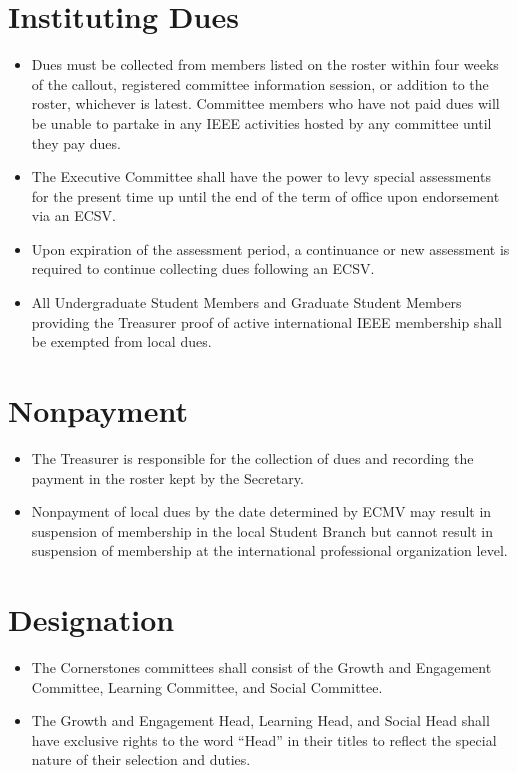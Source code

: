 \documentclass[12pt]{constitution}
\begin{document}
\section{Instituting Dues}
\label{sec:dues_institute}
\begin{itemize}
    \item Dues must be collected from members listed on the roster within four weeks of the callout, registered committee information session, or addition to the roster, whichever is latest. Committee members who have not paid dues will be unable to partake in any IEEE activities hosted by any committee until they pay dues.
    \item The Executive Committee shall have the power to levy special assessments for the present time up until the end of the term of office upon endorsement via an ECSV.
    \item Upon expiration of the assessment period, a continuance or new assessment is required to continue collecting dues following an ECSV.
    \item All Undergraduate Student Members and Graduate Student Members providing the Treasurer proof of active international IEEE membership shall be exempted from local dues.
\end{itemize}

\section{Nonpayment}
\label{sec:dues_nonpay}
\begin{itemize}
    \item The Treasurer is responsible for the collection of dues and recording the payment in the roster kept by the Secretary.
    \item Nonpayment of local dues by the date determined by ECMV may result in suspension of membership in the local Student Branch but cannot result in suspension of membership at the international professional organization level.
\end{itemize}


\label{art:cornerstones}

\section{Designation}
\label{sec:corner_desig}
\begin{itemize}
    \item The Cornerstones committees shall consist of the Growth and Engagement Committee, Learning Committee, and Social Committee.
    \item The Growth and Engagement Head, Learning Head, and Social Head shall have exclusive rights to the word ``Head'' in their titles to reflect the special nature of their selection and duties.
\end{itemize}
\end{document}

